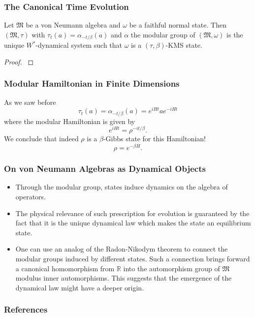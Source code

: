\documentclass{beamer}
\begin{document}
\begin{frame}
	\frametitle{The Canonical Time Evolution}
	\begin{theorem}[$\bigstar\bigstar\bigstar$]
		Let $\mathfrak{M}$ be a von Neumann algebra and $\omega$ be a faithful normal state. Then $(\mathfrak{M},\tau)$ with $\tau_t(a) = \alpha_{-t/\beta}(a)$ and $\alpha$ the modular group of $(\mathfrak{M},\omega)$ is the unique $W^*$-dynamical system such that $\omega$ is a $(\tau,\beta)$-KMS state.
	\end{theorem}
	\begin{proof}
		\cite{Duvenhage1999}
	\end{proof}
\end{frame}

\begin{frame}

	\frametitle{Modular Hamiltonian in Finite Dimensions}
	
	\begin{Example}
		As we saw before
		\begin{equation}
			\tau_t(a)=\alpha_{-t/\beta}(a)=e^{iHt}ae^{-iHt}
		\end{equation}
where the modular Hamiltonian is given by
		\begin{equation}
			e^{iHt}=\rho^{-it/\beta}.
		\end{equation}
We conclude that indeed $\rho$ is a $\beta$-Gibbs state for this Hamiltonian!
		\begin{equation}
			\rho=e^{-\beta H}.
		\end{equation}
		
	\end{Example}

\end{frame}

\begin{frame}
	\frametitle{On von Neumann Algebras as Dynamical Objects}
	\begin{itemize}
		\item Through the modular group, states induce dynamics on the algebra of operators.
		\item The physical relevance of such prescription for evolution is guaranteed by the fact that it is the unique  dynamical law which makes the state an equilibrium state.
		\item One can use an analog of the Radon-Nikodym theorem to connect the modular groups induced by different states. Such a connection brings forward a canonical  homomorphism from $\mathbb{R}$ into the automorphism group of $\mathfrak{M}$ modulus inner automorphisms. This suggests that the emergence of the dynamical law might have a deeper origin.  
	\end{itemize}
\end{frame}

\begin{frame}[allowframebreaks]
	\frametitle{References}
	
	
\end{frame}
\end{document}

